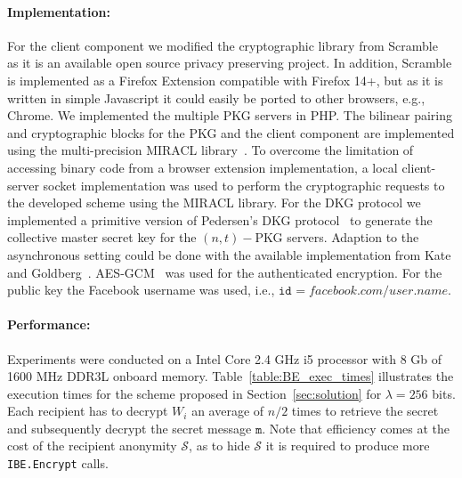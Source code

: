 \documentclass[journal]{IEEEtran}
\newcommand{\secref}[1]{{Section}~\ref{#1}}
\newcommand{\msg}{\ensuremath{\mathtt{m}}}
\newcommand{\id}[1]{\ensuremath{\mathtt{id}_{#1}}}
\begin{document}
\paragraph{Implementation:}
For the client component we modified the cryptographic library from Scramble~\cite{BeatoScramble} as it is an available open source privacy preserving project. In addition, Scramble is implemented as a Firefox Extension compatible with Firefox 14+, but as it is written in simple Javascript it could easily be ported to other browsers, e.g., Chrome. 
We implemented the multiple PKG servers in PHP.
The bilinear pairing and cryptographic blocks for the PKG and the client component are implemented using the multi-precision {MIRACL} library~\cite{scott2003miracl}. To overcome the limitation of accessing binary code from a browser extension implementation, a local client-server socket implementation was used to perform the cryptographic requests to the developed scheme using the {MIRACL} library.
For the DKG protocol we implemented a primitive version of Pedersen's DKG protocol~\cite{art:Pedersen91a} to generate the collective master secret key for the $(n,t)-$PKG servers. Adaption to the asynchronous setting could be done with the available implementation from Kate and Goldberg~\cite{DBLP:conf/icdcs/KateG09,dkg-software}. AES-GCM~\cite{rfc5288} was used for the authenticated encryption. For the public key the Facebook username was used, i.e., $\id{}=facebook.com/user.name$. 


\paragraph{Performance:} 
Experiments were conducted on a Intel Core 2.4 GHz i5 processor with 8 Gb of 1600 MHz DDR3L onboard memory. Table~\ref{table:BE_exec_times} illustrates the 
execution times for the scheme proposed in \secref{sec:solution} for $\lambda=256$ bits. Each recipient has to decrypt $W_i$ an average of $n/2$ times to retrieve the secret and subsequently decrypt the secret message \msg. Note that efficiency comes at the cost of the recipient anonymity $\mathcal{S}$, as to hide $\mathcal{S}$ it is required to produce more \texttt{IBE.Encrypt} calls.
\end{document}
